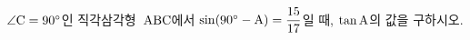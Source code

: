$\angle\mathrm{C}=90^\circ$인 직각삼각형~$\mathrm{ABC}$에서 $\sin(90^\circ-\mathrm{A})=\dfrac{15}{17}$일 때, $\tan\mathrm{A}$의 값을 구하시오.
